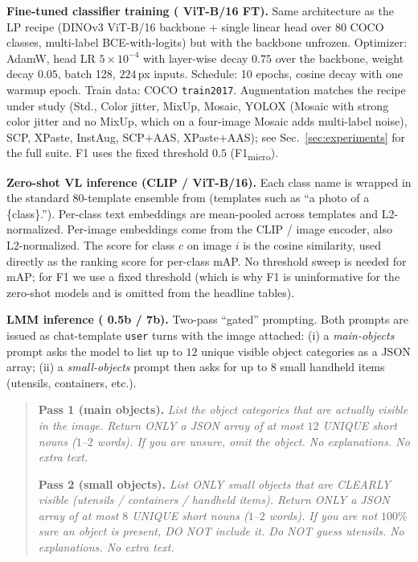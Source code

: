 \noindent\textbf{Fine-tuned classifier training (\dinov{} ViT-B/16 FT).}
Same architecture as the LP recipe (DINOv3 ViT-B/16 backbone + single linear head over $80$ COCO classes, multi-label BCE-with-logits) but with the backbone unfrozen. Optimizer: AdamW, head LR $5{\times}10^{-4}$ with layer-wise decay $0.75$ over the backbone, weight decay $0.05$, batch 128, $224$\,px inputs. Schedule: 10 epochs, cosine decay with one warmup epoch. Train data: COCO \texttt{train2017}. Augmentation matches the recipe under study (Std., Color jitter, MixUp, Mosaic, YOLOX (Mosaic with strong color jitter and no MixUp, which on a four-image Mosaic adds multi-label noise), SCP, XPaste, InstAug, SCP+AAS,
XPaste+AAS); see Sec.~\ref{sec:experiments} for the full suite. F1 uses the fixed threshold $0.5$ (F1\textsubscript{micro}). 

\noindent\textbf{Zero-shot VL inference (CLIP / \openclip{} ViT-B/16).}
Each class name is wrapped in the standard 80-template ensemble from
\citep{radford2021learning} (templates such as ``a photo of a
\{class\}.''). Per-class text embeddings are mean-pooled across
templates and L2-normalized. Per-image embeddings come from the CLIP /
\openclip{} image encoder, also L2-normalized. The score for class
$c$ on image $i$ is the cosine similarity, used directly as the
ranking score for per-class mAP. No threshold sweep is needed for
mAP; for F1 we use a fixed threshold (which is why F1 is uninformative
for the zero-shot models and is omitted from the headline tables).

\noindent\textbf{LMM inference (\llava{} 0.5b / 7b).}
Two-pass ``gated'' prompting. Both prompts are issued as
chat-template \texttt{user} turns with the image attached:
(i) a \emph{main-objects} prompt asks the model to list up to $12$
unique visible object categories as a JSON array;
(ii) a \emph{small-objects} prompt then asks for up to $8$
small handheld items (utensils, containers, etc.).

\begin{quote}\small
\textbf{Pass 1 (main objects).} \emph{List the object categories
that are actually visible in the image. Return ONLY a JSON array
of at most $12$ UNIQUE short nouns ($1$--$2$ words). If you are
unsure, omit the object. No explanations. No extra text.}

\medskip
\textbf{Pass 2 (small objects).} \emph{List ONLY small objects
that are CLEARLY visible (utensils / containers / handheld items).
Return ONLY a JSON array of at most $8$ UNIQUE short nouns ($1$--$2$
words). If you are not $100\%$ sure an object is present, DO NOT
include it. Do NOT guess utensils. No explanations. No extra
text.}
\end{quote}

